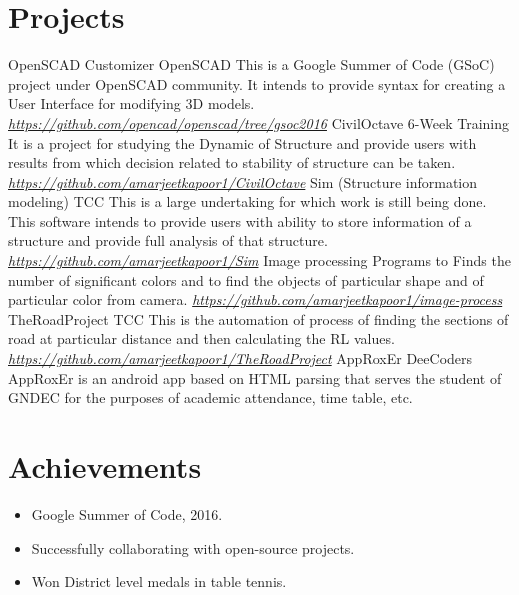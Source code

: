 \documentclass[]{friggeri-cv}
\begin{document}
\section{Projects}
\begin{entrylist}
  \entry
    {}
    {OpenSCAD Customizer}
    {OpenSCAD}
    {
        This is a Google Summer of Code (GSoC) project under OpenSCAD community. It intends to provide syntax for creating a User Interface for modifying 3D models.
        \textit{\href{https://github.com/openscad/openscad/tree/gsoc2016}{https://github.com/opencad/openscad/tree/gsoc2016}}
    }
  \entry
    {}
    {CivilOctave}
    {6-Week Training}
    {
        It is a project for studying the Dynamic of Structure and provide users with
results from which decision related to stability of structure can be taken.  
        \textit{\href{https://github.com/amarjeetkapoor1/CivilOctave}{https://github.com/amarjeetkapoor1/CivilOctave}}
    }
    \entry
    {}
    {Sim (Structure information modeling)}
    {TCC}
    {
       This is a large undertaking for which work is still being done. This software
intends to provide users with ability to store information of a structure and
provide full analysis of that structure.
        \textit{\href{https://github.com/amarjeetkapoor1/Sim}{https://github.com/amarjeetkapoor1/Sim}}
    }
    \entry
    {}
    {Image processing}
    {}
    {
    Programs to Finds the number of significant colors and to find the objects of particular shape and of particular color from camera.
    \textit{\href{https://github.com/amarjeetkapoor1/image-process}{https://github.com/amarjeetkapoor1/image-process}}
    }
    \entry
    {}
    {TheRoadProject}
    {TCC}
    {
    This is the automation of process of finding the sections of road at particular
    distance and then calculating the RL values. 
    \textit{\href{https://github.com/amarjeetkapoor1/TheRoadProject}{ https://github.com/amarjeetkapoor1/TheRoadProject}}
    }
    \entry
    {}
    {AppRoxEr}
    {DeeCoders}
    {
     AppRoxEr is an android app based on HTML parsing that serves the student of GNDEC for the purposes of academic attendance, time table, etc.
    }
\end{entrylist}
\section{Achievements}
\begin{itemize}
\item Google Summer of Code, 2016.
\item Successfully collaborating with open-source projects. 
\item Won District level medals in table tennis.
\end{itemize}
\end{document}
